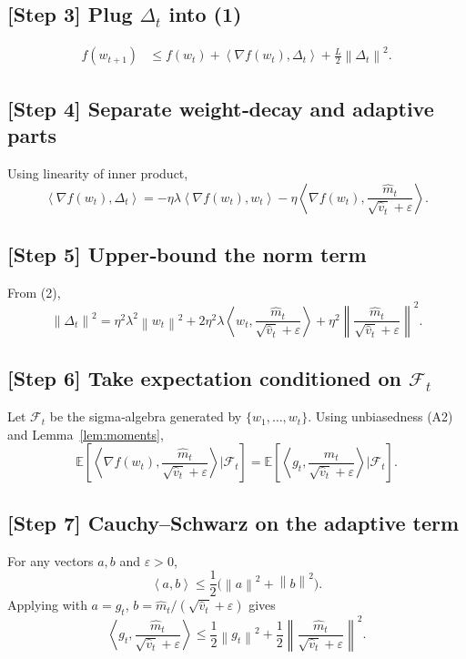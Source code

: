 \documentclass{article}
\newcommand{\EE}{\mathbb{E}}
\newcommand{\norm}[1]{\left\| #1\right\|}
\newcommand{\inner}[2]{\left\langle #1,#2\right\rangle}
\begin{document}
\subsection*{[Step 3] Plug $\Delta_t$ into (1)}
\[
\begin{aligned}
f(w_{t+1}) &\le f(w_t)
+ \inner{\nabla f(w_t)}{\Delta_t}
+ \frac{L}{2}\norm{\Delta_t}^2 .
\end{aligned} \tag{3}
\]

\subsection*{[Step 4] Separate weight‑decay and adaptive parts}
Using linearity of inner product,
\[
\inner{\nabla f(w_t)}{\Delta_t}
= -\eta\lambda\inner{\nabla f(w_t)}{w_t}
      -\eta\inner{\nabla f(w_t)}{\frac{\hat m_t}{\sqrt{\hat v_t}+\varepsilon}} . \tag{4}
\]

\subsection*{[Step 5] Upper‑bound the norm term}
From (2),
\[
\norm{\Delta_t}^2
= \eta^2\lambda^2\norm{w_t}^2
   + 2\eta^2\lambda\inner{w_t}{\frac{\hat m_t}{\sqrt{\hat v_t}+\varepsilon}}
   + \eta^2\norm{\frac{\hat m_t}{\sqrt{\hat v_t}+\varepsilon}}^2 . \tag{5}
\]

\subsection*{[Step 6] Take expectation conditioned on $\mathcal{F}_t$}
Let $\mathcal{F}_t$ be the sigma‑algebra generated by $\{w_1,\dots,w_t\}$.
Using unbiasedness (A2) and Lemma~\ref{lem:moments},
\[
\EE\!\left[\inner{\nabla f(w_t)}{\frac{\hat m_t}{\sqrt{\hat v_t}+\varepsilon}}\Big|\mathcal{F}_t\right]
= \EE\!\left[\inner{g_t}{\frac{\hat m_t}{\sqrt{\hat v_t}+\varepsilon}}\Big|\mathcal{F}_t\right].
\tag{6}
\]

\subsection*{[Step 7] Cauchy–Schwarz on the adaptive term}
For any vectors $a,b$ and $\varepsilon>0$,
\[
\inner{a}{b}\le \frac{1}{2}\bigl(\norm{a}^2+\norm{b}^2\bigr).
\]
Applying with $a=g_t$, $b=\hat m_t/(\sqrt{\hat v_t}+\varepsilon)$ gives
\[
\inner{g_t}{\frac{\hat m_t}{\sqrt{\hat v_t}+\varepsilon}}
\le \frac{1}{2}\norm{g_t}^2
    +\frac{1}{2}\norm{\frac{\hat m_t}{\sqrt{\hat v_t}+\varepsilon}}^2 . \tag{7}
\]
\end{document}
